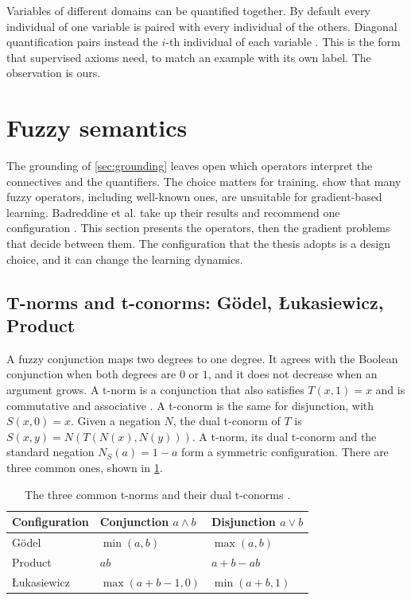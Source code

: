 Variables of different domains can be quantified together. By default every
individual of one variable is paired with every individual of the others.
Diagonal quantification pairs instead the $i$-th individual of each variable
\citep{badreddine2022ltn}. This is the form that supervised axioms need, to
match an example with its own label. The observation is ours.


\section{Fuzzy semantics}
\label{sec:fuzzy-semantics}

The grounding of \cref{sec:grounding} leaves open which operators interpret
the connectives and the quantifiers. The choice matters for training.
\citet{vankrieken2021analyzing} show that many fuzzy operators, including
well-known ones, are unsuitable for gradient-based learning. Badreddine et al.
take up their results and recommend one configuration
\citep{badreddine2022ltn}. This section presents the operators, then the
gradient problems that decide between them. The configuration that the thesis
adopts is a design choice, and it can change the learning dynamics.

\subsection{T-norms and t-conorms: G\"odel, {\L}ukasiewicz, Product}
\label{sec:t-norms}

A fuzzy conjunction maps two degrees to one degree. It agrees with the Boolean
conjunction when both degrees are $0$ or $1$, and it does not decrease when an
argument grows. A t-norm is a conjunction that also satisfies $T(x,1)=x$ and
is commutative and associative \citep{badreddine2022ltn}. A t-conorm is the
same for disjunction, with $S(x,0)=x$. Given a negation $N$, the dual t-conorm
of $T$ is $S(x,y)=N(T(N(x),N(y)))$. A t-norm, its dual t-conorm and the
standard negation $N_S(a)=1-a$ form a symmetric configuration. There are three
common ones, shown in \cref{tab:t-norms}.

\begin{table}[htbp]
\centering
\footnotesize
\caption{The three common t-norms and their dual t-conorms
\citep{badreddine2022ltn}.}
\label{tab:t-norms}
\begin{tabular}{@{}lll@{}}
\toprule
Configuration & Conjunction $a\wedge b$ & Disjunction $a\vee b$ \\
\midrule
G\"odel & $\min(a,b)$ & $\max(a,b)$ \\
Product & $ab$ & $a+b-ab$ \\
{\L}ukasiewicz & $\max(a+b-1,0)$ & $\min(a+b,1)$ \\
\bottomrule
\end{tabular}
\end{table}

